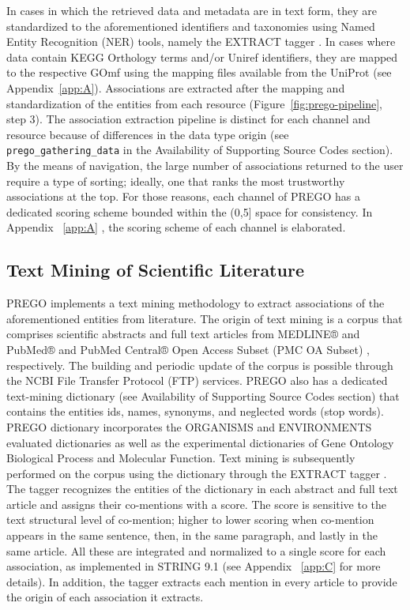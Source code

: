   In cases in which the retrieved data and metadata are in text form, they are standardized to the aforementioned identifiers and taxonomies using Named Entity Recognition (NER) tools, namely the EXTRACT tagger \parencite{pafilis2016extract, jensen2016one}. 
   In cases where data contain KEGG Orthology terms and/or Uniref identifiers, they are mapped to the respective GOmf using the mapping files available from the UniProt (see Appendix~\ref{app:A}). 
   Associations are extracted after the mapping and standardization of the entities from each resource (Figure~\ref{fig:prego-pipeline}, step 3).
   The association extraction pipeline is distinct for each channel and resource because of differences in the data type origin (see \texttt{prego\_gathering\_data} in the Availability of Supporting Source Codes section). 
   By the means of navigation, the large number of associations returned to the user require a type of sorting; 
   ideally, one that ranks the most trustworthy associations at the top. 
   For those reasons, each channel of PREGO has a dedicated scoring scheme bounded within the (0,5] space for consistency. 
   In Appendix ~\ref{app:A} , the scoring scheme of each channel is elaborated.




   \subsection{Text Mining of Scientific Literature}
   \label{subsec:prego-tm}

   PREGO implements a text mining methodology to extract associations of the aforementioned entities from literature. 
   The origin of text mining is a corpus that comprises scientific abstracts and full text articles from MEDLINE® and PubMed® and PubMed Central® Open Access Subset (PMC OA Subset) \parencite{sayers2021database}, respectively. 
   The building and periodic update of the corpus is possible through the NCBI File Transfer Protocol (FTP) services. 
   PREGO also has a dedicated text-mining dictionary (see Availability of Supporting Source Codes section) that contains the entities ids, names, synonyms, and neglected words (stop words). 
   PREGO dictionary incorporates the ORGANISMS \parencite{pafilis2013species} and ENVIRONMENTS \parencite{pafilis2015environments} evaluated dictionaries as well as the experimental dictionaries of Gene Ontology Biological Process and Molecular Function.
   Text mining is subsequently performed on the corpus using the dictionary through the EXTRACT tagger \parencite{pafilis2016extract, jensen2016one}. 
   The tagger recognizes the entities of the dictionary in each abstract and full text article and assigns their co-mentions with a score. 
   The score is sensitive to the text structural level of co-mention; higher to lower scoring when co-mention appears in the same sentence, then, in the same paragraph, and lastly in the same article. 
   All these are integrated and normalized to a single score for each association, as implemented in STRING 9.1 \parencite{franceschini2012string} (see Appendix ~\ref{app:C} for more details). 
   In addition, the tagger extracts each mention in every article to provide the origin of each association it extracts.


